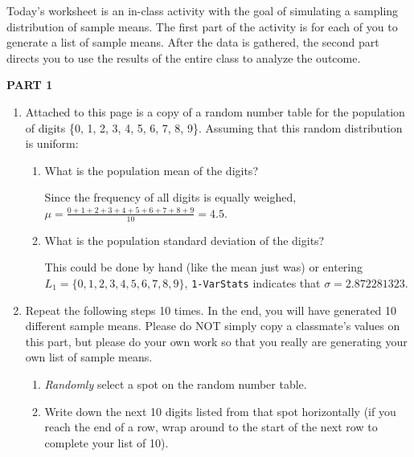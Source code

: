 \documentclass{article}
\newcommand{\answer}[1]{\color{red}#1}
\begin{document}
\pagestyle{myheadings}

\begin{center}
\textbf{}
\end{center}

Today's worksheet is an in-class activity with the goal of simulating a sampling distribution of sample means. The first part of the activity is for each of you to generate a list of sample means. After the data is gathered, the second part directs you to use the results of the entire class to analyze the outcome.

\textbf{PART 1}

\begin{enumerate}

\item Attached to this page is a copy of a random number table for the population of digits \{0, 1, 2, 3, 4, 5, 6, 7, 8, 9\}. Assuming that this random distribution is uniform:

	\begin{enumerate}
	
	\item What is the population mean of the digits? 
	
	{\answer Since the frequency of all digits is equally weighed, $\mu = \frac{0+1+2+3+4+5+6+7+8+9}{10} = 4.5$.
	}
	
	\item What is the population standard deviation of the digits? 
	
	{\answer This could be done by hand (like the mean just was) or entering $L_1=\{0, 1, 2, 3, 4, 5, 6, 7, 8, 9\}$, \texttt{1-VarStats} indicates that $\sigma = 2.872281323$.
	} 
	\end{enumerate}
	
\item Repeat the following steps 10 times. In the end, you will have generated 10 different sample means. Please do NOT simply copy a classmate's values on this part, but please do your own work so that you really are generating your own list of sample means. 

	\begin{enumerate}
	
	\item {\em Randomly} select a spot on the random number table.
	
	\item Write down the next 10 digits listed from that spot horizontally (if you reach the end of a row, wrap around to the start of the next row to complete your list of 10). 
	

\end{enumerate}
\end{enumerate}
\end{document}
